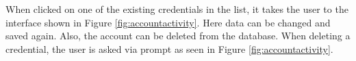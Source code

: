 When clicked on one of the existing credentials in the list, it takes the user to the interface shown in Figure \ref{fig:accountactivity}\protect{}.  Here data can be changed and saved again. Also, the account can be deleted from the database. When deleting a credential, the user is asked via prompt as seen in Figure \ref{fig:accountactivity}\protect{}.

\begin{figure}[H]
\centering
{}
\qquad
{}
\qquad
{}

\end{figure}
